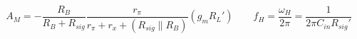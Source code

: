 \begin{equation*}
  \begin{aligned}
    A_M = - \dfrac{R_B}{R_B + R_{sig}} \dfrac{r_{\pi}}{r_{\pi} + r_x + \left( R_{sig} \parallel R_B \right)} \left( g_m R_L' \right) \quad\quad f_H = \dfrac{\omega_H}{2 \pi} = \dfrac{1}{2 \pi C_{in} R_{sig}'}   
  \end{aligned}
\end{equation*}


